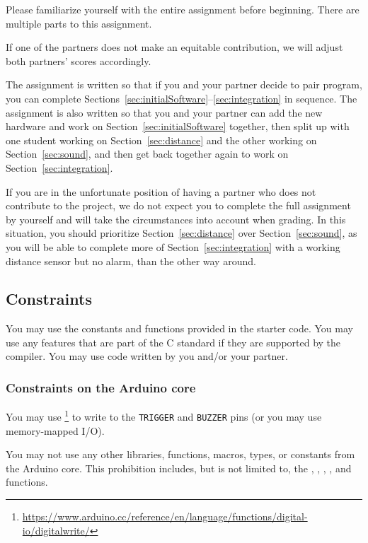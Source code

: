 Please familiarize yourself with the entire assignment before beginning.
There are multiple parts to this assignment.

If one of the partners does not make an equitable contribution, we will adjust both partners' scores accordingly.

The assignment is written so that if you and your partner decide to pair program, you can complete Sections~\ref{sec:initialSoftware}--\ref{sec:integration} in sequence.
The assignment is also written so that you and your partner can add the new hardware and work on Section~\ref{sec:initialSoftware} together, then split up with one student working on Section~\ref{sec:distance} and the other working on Section~\ref{sec:sound}, and then get back together again to work on Section~\ref{sec:integration}.

If you are in the unfortunate position of having a partner who does not contribute to the project, we do not expect you to complete the full assignment by yourself and will take the circumstances into account when grading.
In this situation, you should prioritize Section~\ref{sec:distance} over Section~\ref{sec:sound}, as you will be able to complete more of Section~\ref{sec:integration} with a working distance sensor but no alarm, than the other way around.

\subsection{Constraints} \label{subsec:constraints}

You may use the constants and functions provided in the starter code.
You may use any features that are part of the C standard if they are supported by the compiler.
You may use code written by you and/or your partner.

\subsubsection{Constraints on the Arduino core}

You may use \footnote{
    \url{https://www.arduino.cc/reference/en/language/functions/digital-io/digitalwrite/}
} to write to the \lstinline{TRIGGER} and \lstinline{BUZZER} pins (or you may use memory-mapped I/O).

You may not use any other libraries, functions, macros, types, or constants from the Arduino core.
This prohibition includes, but is not limited to, the , , , , and  functions.

